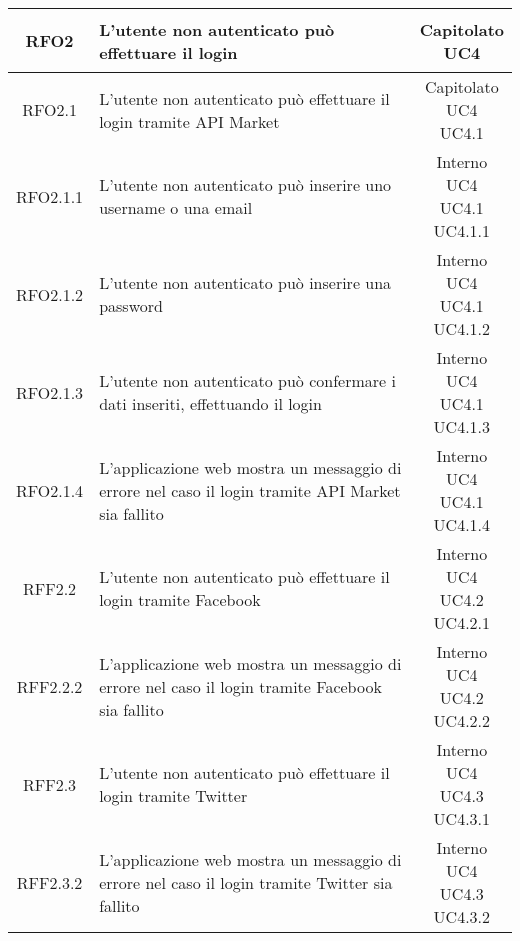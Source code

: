 \begin{longtable}{|c|p{8cm}|c|}
\hypertarget{RFO2}{RFO2} & L'utente non autenticato può effettuare il login & \makecell*{Capitolato\\UC4} \\
\hline

\hypertarget{RFO2.1}{RFO2.1} & L'utente non autenticato può effettuare il login tramite API Market & \makecell*{Capitolato\\UC4\\UC4.1} \\
\hline

\hypertarget{RFO2.1.1}{RFO2.1.1} & L'utente non autenticato può inserire uno username o una email & \makecell*{Interno\\UC4\\UC4.1\\UC4.1.1} \\
\hline
\hypertarget{RFO2.1.2}{RFO2.1.2} & L'utente non autenticato può inserire una password & \makecell*{Interno\\UC4\\UC4.1\\UC4.1.2} \\
\hline
\hypertarget{RFO2.1.3}{RFO2.1.3} & L'utente non autenticato può confermare i dati inseriti, effettuando il login & \makecell*{Interno\\UC4\\UC4.1\\UC4.1.3} \\
\hline
\hypertarget{RFO2.1.4}{RFO2.1.4} & L'applicazione web mostra un messaggio di errore nel caso il login tramite API Market sia fallito & \makecell*{Interno\\UC4\\UC4.1\\UC4.1.4} \\
\hline

\hypertarget{RFF2.2}{RFF2.2} & L'utente non autenticato può effettuare il login tramite Facebook & \makecell*{Interno\\UC4\\UC4.2\\UC4.2.1} \\
\hline
\hypertarget{RFF2.2.2}{RFF2.2.2} & L'applicazione web mostra un messaggio di errore nel caso il login tramite Facebook sia fallito & \makecell*{Interno\\UC4\\UC4.2\\UC4.2.2} \\
\hline

\hypertarget{RFF2.3}{RFF2.3} & L'utente non autenticato può effettuare il login tramite Twitter & \makecell*{Interno\\UC4\\UC4.3\\UC4.3.1} \\
\hline
\hypertarget{RFF2.3.2}{RFF2.3.2} & L'applicazione web mostra un messaggio di errore nel caso il login tramite Twitter sia fallito & \makecell*{Interno\\UC4\\UC4.3\\UC4.3.2} \\
\hline


\end{longtable}
